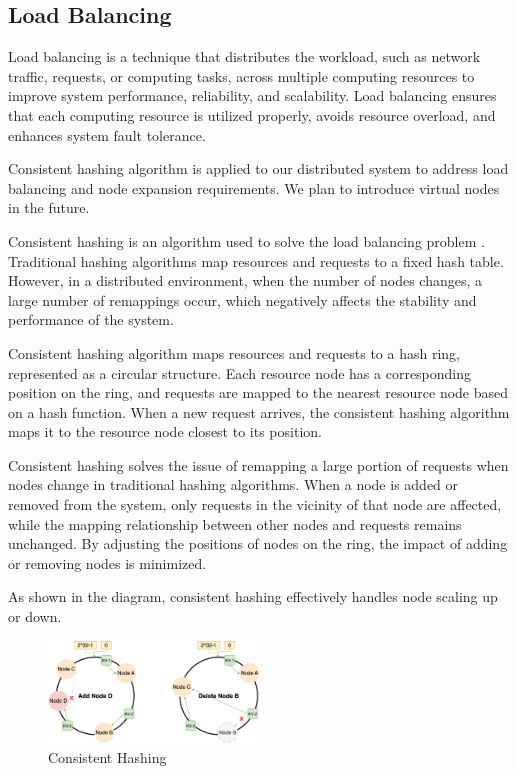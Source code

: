 \documentclass[sigconf]{acmart}
\begin{document}
\subsection{Load Balancing}

Load balancing \cite{ghomi2017load} \cite{chou1982load} is a technique that distributes the workload, such as network traffic, requests, or computing tasks, across multiple computing resources to improve system performance, reliability, and scalability. Load balancing ensures that each computing resource is utilized properly, avoids resource overload, and enhances system fault tolerance.

Consistent hashing algorithm \cite{coluzzi2023survey} \cite{karger1997consistent} is applied to our distributed system to address load balancing and node expansion requirements. We plan to introduce virtual nodes in the future.

Consistent hashing is an algorithm used to solve the load balancing problem \cite{wang2007load}. Traditional hashing algorithms map resources and requests to a fixed hash table. However, in a distributed environment, when the number of nodes changes, a large number of remappings occur, which negatively affects the stability and performance of the system.

Consistent hashing algorithm maps resources and requests to a hash ring, represented as a circular structure. Each resource node has a corresponding position on the ring, and requests are mapped to the nearest resource node based on a hash function. When a new request arrives, the consistent hashing algorithm maps it to the resource node closest to its position.

Consistent hashing solves the issue of remapping a large portion of requests when nodes change in traditional hashing algorithms. When a node is added or removed from the system, only requests in the vicinity of that node are affected, while the mapping relationship between other nodes and requests remains unchanged. By adjusting the positions of nodes on the ring, the impact of adding or removing nodes is minimized.

As shown in the diagram, consistent hashing effectively handles node scaling up or down.
\begin{figure}[htbp]
    \centering
    \includegraphics[width=0.5\textwidth]{cloud_database_report/asset/consisten.png}
    \caption{Consistent Hashing}
    \label{fig:xxx}
\end{figure}
\end{document}
